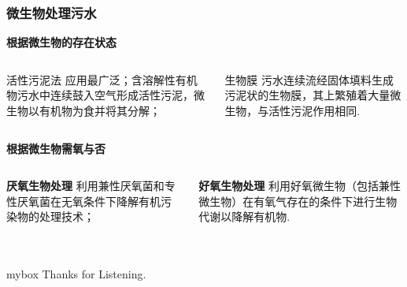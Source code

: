 \documentclass[10pt,aspectratio=43,mathserif]{beamer}
\begin{document}
		\begin{frame}
		  \frametitle{微生物处理污水}
          \textbf{根据微生物的存在状态}
          \begin{columns}[c]
    		  \begin{block}{活性污泥法}
                  应用最广泛；含溶解性有机物污水中连续鼓入空气形成活性污泥，微生物以有机物为食并将其分解；
              \end{block}
              \begin{block}{生物膜}
                污水连续流经固体填料生成污泥状的生物膜，其上繁殖着大量微生物，与活性污泥作用相同.
              \end{block}
          \end{columns}
      
          \textbf{根据微生物需氧与否}
          \begin{columns}[c]
              \begin{block}{\textbf{厌氧生物处理}}
                  利用兼性厌氧菌和专性厌氧菌在无氧条件下降解有机污染物的处理技术；
              \end{block}
              \begin{block}{\textbf{好氧生物处理}}
                  利用好氧微生物（包括兼性微生物）在有氧气存在的条件下进行生物代谢以降解有机物.
              \end{block}
          \end{columns}
		\end{frame}
\section*{}
            \begin{frame}

                \begin{center}
                    \begin{minipage}{1\textwidth}
                        \begin{beamercolorbox}[wd=0.70\textwidth, rounded=true, shadow=true]{mybox}
                        \LARGE \centering Thanks for Listening.
                        \end{beamercolorbox}
                    \end{minipage}
                \end{center}

            \end{frame}
\end{document}
